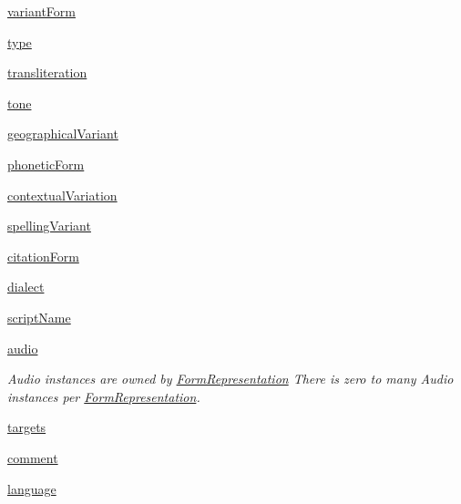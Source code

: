 \begin{DoxyCompactItemize}
\item 
\hyperlink{classlmf_1_1src_1_1core_1_1form__representation_1_1_form_representation_ab271a76ed31e46ce4c1e66fad2651a73}{variant\+Form}
\item 
\hyperlink{classlmf_1_1src_1_1core_1_1form__representation_1_1_form_representation_a26785ac6e2bf05ebefb60d1c019db55d}{type}
\item 
\hyperlink{classlmf_1_1src_1_1core_1_1form__representation_1_1_form_representation_ab192387108c3c4e780297d1b409d5eff}{transliteration}
\item 
\hyperlink{classlmf_1_1src_1_1core_1_1form__representation_1_1_form_representation_a2cfea0271f8abfcffb74afb7641ef4df}{tone}
\item 
\hyperlink{classlmf_1_1src_1_1core_1_1form__representation_1_1_form_representation_a7d080181b73f2c03d3a2cf65a97be169}{geographical\+Variant}
\item 
\hyperlink{classlmf_1_1src_1_1core_1_1form__representation_1_1_form_representation_a50b914930f083c55e70e805a2430e88d}{phonetic\+Form}
\item 
\hyperlink{classlmf_1_1src_1_1core_1_1form__representation_1_1_form_representation_a1068952fddde59f78e8a56b785b0bcbf}{contextual\+Variation}
\item 
\hyperlink{classlmf_1_1src_1_1core_1_1form__representation_1_1_form_representation_aef2857854ecb2ca02c7ede104b617505}{spelling\+Variant}
\item 
\hyperlink{classlmf_1_1src_1_1core_1_1form__representation_1_1_form_representation_a70151ff258dea274006e4976818847a3}{citation\+Form}
\item 
\hyperlink{classlmf_1_1src_1_1core_1_1form__representation_1_1_form_representation_ad19ad7a519048bc71ff0d0df2c888621}{dialect}
\item 
\hyperlink{classlmf_1_1src_1_1core_1_1form__representation_1_1_form_representation_a728fa20d7dcdbb6714f97b87cbe8ee0f}{script\+Name}
\item 
\hyperlink{classlmf_1_1src_1_1core_1_1form__representation_1_1_form_representation_ac13f0605619b9bdc6b921ae19b39c068}{audio}
\begin{DoxyCompactList}\small\item\em Audio instances are owned by \hyperlink{classlmf_1_1src_1_1core_1_1form__representation_1_1_form_representation}{Form\+Representation} There is zero to many Audio instances per \hyperlink{classlmf_1_1src_1_1core_1_1form__representation_1_1_form_representation}{Form\+Representation}. \end{DoxyCompactList}\item 
\hyperlink{classlmf_1_1src_1_1core_1_1form__representation_1_1_form_representation_a94e0845b7cf84cdbef5f1dceae0d7f99}{targets}
\item 
\hyperlink{classlmf_1_1src_1_1core_1_1form__representation_1_1_form_representation_a6118f5b7524574bd2e552c58b9337165}{comment}
\item 
\hyperlink{classlmf_1_1src_1_1core_1_1form__representation_1_1_form_representation_ad42d4a830850a55fd08ba3742abdde57}{language}
\end{DoxyCompactItemize}


